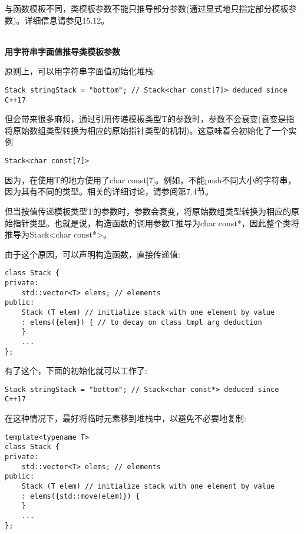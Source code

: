 与函数模板不同，类模板参数不能只推导部分参数(通过显式地只指定部分模板参数)。详细信息请参见15.12。

\hspace*{\fill} \\ %
\noindent
\textbf{用字符串字面值推导类模板参数}

原则上，可以用字符串字面值初始化堆栈:

\begin{lstlisting}[style=styleCXX]
Stack stringStack = "bottom"; // Stack<char const[7]> deduced since C++17
\end{lstlisting}

但会带来很多麻烦，通过引用传递模板类型T的参数时，参数不会衰变(衰变是指将原始数组类型转换为相应的原始指针类型的机制)。这意味着会初始化了一个实例

\begin{lstlisting}[style=styleCXX]
Stack<char const[7]>
\end{lstlisting}

因为，在使用T的地方使用了char const[7]。例如，不能push不同大小的字符串，因为其有不同的类型。相关的详细讨论，请参阅第7.4节。

但当按值传递模板类型T的参数时，参数会衰变，将原始数组类型转换为相应的原始指针类型。也就是说，构造函数的调用参数T推导为char const*，因此整个类将推导为Stack<char const*>。

由于这个原因，可以声明构造函数，直接传递值:

\begin{lstlisting}[style=styleCXX]
class Stack {
private:
	std::vector<T> elems; // elements
public:
	Stack (T elem) // initialize stack with one element by value
	: elems({elem}) { // to decay on class tmpl arg deduction
	}
	...
};
\end{lstlisting}

有了这个，下面的初始化就可以工作了:

\begin{lstlisting}[style=styleCXX]
Stack stringStack = "bottom"; // Stack<char const*> deduced since C++17
\end{lstlisting}

在这种情况下，最好将临时元素移到堆栈中，以避免不必要地复制:

\begin{lstlisting}[style=styleCXX]
template<typename T>
class Stack {
private:
	std::vector<T> elems; // elements
public:
	Stack (T elem) // initialize stack with one element by value
	: elems({std::move(elem)}) {
	}
	...
};
\end{lstlisting}

